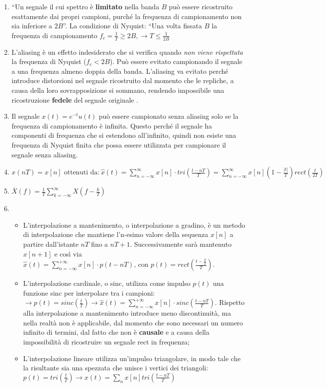 \documentclass[
]{article}
\begin{document}
\begin{enumerate}
\def\labelenumi{\arabic{enumi}.}
\setcounter{enumi}{13}
\item
  ``Un segnale il cui spettro è \textbf{limitato} nella banda \(B\) può
  essere ricostruito esattamente dai propri campioni, purché la
  frequenza di campionamento non sia inferiore a \(2B\)''. La condizione
  di Nyquist: ``Una volta fissata \(B\) la frequenza di campionamento
  \(f_c = \frac{1}{T} \geq 2B, \to T \leq \frac{1}{2B}\)
\item
  L'aliasing è un effetto indesiderato che si verifica quando \emph{non
  viene rispettata} la frequenza di Nyquist (\(f_c < 2B\)). Può essere
  evitato campionando il segnale a una frequenza almeno doppia della
  banda. L'aliasing va evitato perché introduce distorsioni nel segnale
  ricostruito dal momento che le repliche, a causa della loro
  sovrapposizione si sommano, rendendo impossibile una ricostruzione
  \textbf{fedele} del segnale originale .
\item
  Il segnale \(x(t)=e^{-t}u(t)\) può essere campionato senza aliasing
  solo se la frequenza di campionamento è infinita. Questo perché il
  segnale ha componenti di frequenza che si estendono all'infinito,
  quindi non esiste una frequenza di Nyquist finita che possa essere
  utilizzata per campionare il segnale senza aliasing.
\item
  \(\displaystyle x(nT) = x[n] \text{ ottenuti da:} \ \hat{x}(t)= \sum_{n= -\infty}^{\infty} x[n] \cdot tri(\frac{t-nT}{T})= \sum_{n= -\infty}^{\infty}x[n] (1-\frac{|t|}{T})rect(\frac{t}{2T})\)
\item
  \(\overline{X}(f) = \frac{1}{T}\sum_{k=-\infty}^{\infty}X(f-\frac{k}{T})\)
\item
  \begin{itemize}
  \item
    L'interpolazione a mantenimento, o interpolazione a gradino, è un
    metodo di interpolazione che mantiene l'n-esimo valore della
    sequenza \(x[n]\) a partire dall'istante \(nT\) fino a \(nT+1\).
    Successivamente sarà mantenuto \(x[n+1]\) e così via\\
    \(\hat{x}(t)=\sum_{n=-\infty}^{+\infty}x[n]\cdot p(t-nT)\text{, con } p(t)= rect(\frac{t-\frac{T}{2}}{T})\).
  \item
    L'interpolazione cardinale, o sinc, utilizza come impulso \(p(t)\)
    una funzione sinc per interpolare tra i campioni:
    \(\to p(t)=sinc(\frac{t}{T}) \to \hat{x}(t)=\sum_{n=-\infty}^{+\infty} x[n]\cdot sinc(\frac{t-nT}{T})\).
    Rispetto alla interpolazione a mantenimento introduce meno
    discontinuità, ma nella realtà non è applicabile, dal momento che
    sono necessari un numero infinito di termini, dal fatto che non è
    \textbf{causale} e a causa della impossibilità di ricostruire un
    segnale rect in frequenza;
  \item
    L'interpolazione lineare utilizza un'impulso triangolare, in modo
    tale che la risultante sia una spezzata che unisce i vertici dei
    triangoli:
    \(p(t) = tri(\frac{t}{T}) \to \hat{x}(t) = \sum_n x[n]tri(\frac{t-nT}{T})\)


\end{itemize}
\end{enumerate}
\end{document}
